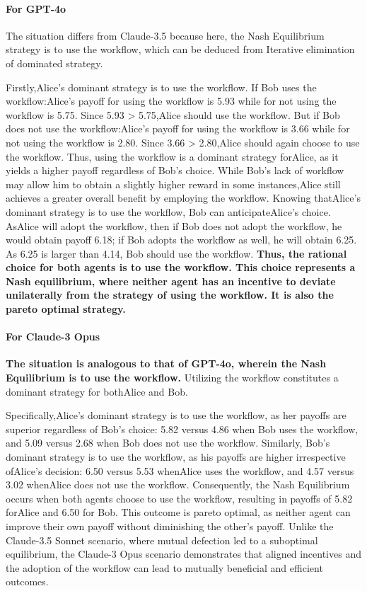 \paragraph{For GPT-4o} The situation differs from Claude-3.5 because here, the Nash Equilibrium strategy is to use the workflow, which can be deduced from Iterative elimination of dominated strategy. 

Firstly,Alice’s dominant strategy is to use the workflow. If Bob uses the workflow:Alice’s payoff for using the workflow is 5.93 while for not using the workflow is 5.75. Since 5.93 > 5.75,Alice should use the workflow. But if Bob does not use the workflow:Alice’s payoff for using the workflow is 3.66 while for not using the workflow is 2.80. Since 3.66 > 2.80,Alice should again choose to use the workflow. Thus, using the workflow is a dominant strategy forAlice, as it yields a higher payoff regardless of Bob’s choice. While Bob’s lack of workflow may allow him to obtain a slightly higher reward in some instances,Alice still achieves a greater overall benefit by employing the workflow. Knowing thatAlice’s dominant strategy is to use the workflow, Bob can anticipateAlice’s choice. AsAlice will adopt the workflow, then if Bob does not adopt the workflow, he would obtain payoff 6.18; if Bob adopts the workflow as well, he will obtain 6.25. As 6.25 is larger than 4.14, Bob should use the workflow. \textbf{Thus, the rational choice for both agents is to use the workflow. This choice represents a Nash equilibrium, where neither agent has an incentive to deviate unilaterally from the strategy of using the workflow. It is also the pareto optimal strategy.}

\paragraph{For Claude-3 Opus} \textbf{The situation is analogous to that of GPT-4o, wherein the Nash Equilibrium is to use the workflow.} Utilizing the workflow constitutes a dominant strategy for bothAlice and Bob. 

Specifically,Alice’s dominant strategy is to use the workflow, as her payoffs are superior regardless of Bob’s choice: 5.82 versus 4.86 when Bob uses the workflow, and 5.09 versus 2.68 when Bob does not use the workflow. Similarly, Bob’s dominant strategy is to use the workflow, as his payoffs are higher irrespective ofAlice’s decision: 6.50 versus 5.53 whenAlice uses the workflow, and 4.57 versus 3.02 whenAlice does not use the workflow. Consequently, the Nash Equilibrium occurs when both agents choose to use the workflow, resulting in payoffs of 5.82 forAlice and 6.50 for Bob. This outcome is pareto optimal, as neither agent can improve their own payoff without diminishing the other’s payoff. Unlike the Claude-3.5 Sonnet scenario, where mutual defection led to a suboptimal equilibrium, the Claude-3 Opus scenario demonstrates that aligned incentives and the adoption of the workflow can lead to mutually beneficial and efficient outcomes.

